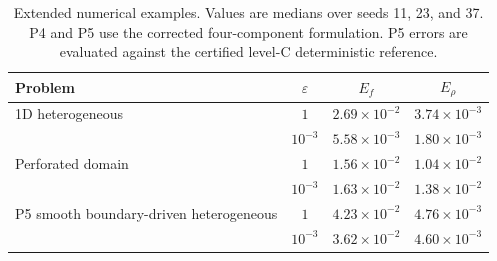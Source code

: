 \begin{table}[t]
\centering
\caption{Extended numerical examples. Values are medians over seeds 11, 23, and 37. P4 and P5 use the corrected four-component formulation. P5 errors are evaluated against the certified level-C deterministic reference.}
\label{tab:extended}
\begin{tabular}{lccc}
\toprule
Problem & $\varepsilon$ & $E_f$ & $E_\rho$\\
\midrule
1D heterogeneous & $1$ & $2.69\times10^{-2}$ & $3.74\times10^{-3}$\\
 & $10^{-3}$ & $5.58\times10^{-3}$ & $1.80\times10^{-3}$\\
\midrule
Perforated domain & $1$ & $1.56\times10^{-2}$ & $1.04\times10^{-2}$\\
 & $10^{-3}$ & $1.63\times10^{-2}$ & $1.38\times10^{-2}$\\
\midrule
P5 smooth boundary-driven heterogeneous & $1$ & $4.23\times10^{-2}$ & $4.76\times10^{-3}$\\
 & $10^{-3}$ & $3.62\times10^{-2}$ & $4.60\times10^{-3}$\\
\bottomrule
\end{tabular}
\end{table}
